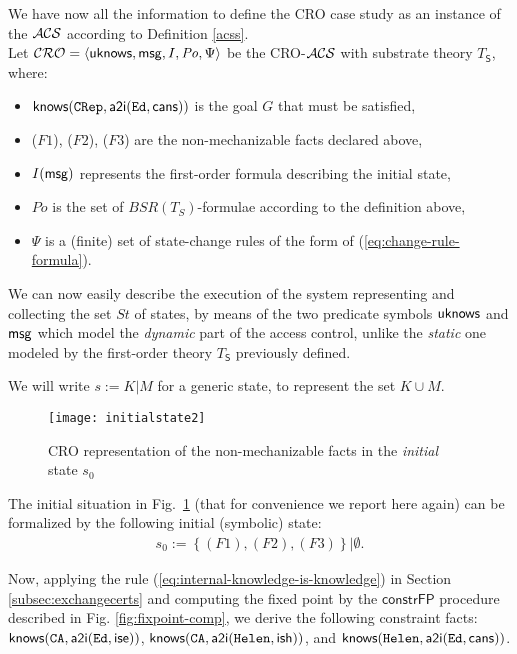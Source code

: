 \documentclass[conference]{llncs}
\newcommand{\theCA}{\ensuremath \mathtt{CA}}
\newcommand{\Ed}{\ensuremath \mathtt{Ed}}
\newcommand{\Helen}{\ensuremath \mathtt{Helen}}
\newcommand{\CRep}{\ensuremath \mathtt{CRep}}
\newcommand{\canstoredoc}{\ensuremath \mathsf{cans}}
\newcommand{\ishead}{\ensuremath \mathsf{ish}}
\newcommand{\isemployee}{\ensuremath \mathsf{ise}}
\newcommand{\know}{\ensuremath \mathsf{knows}}
\newcommand{\msg}{\ensuremath \mathsf{msg}}
\newcommand{\atoi}{\ensuremath \mathsf{a2i}}
\newcommand{\knowzero}{\ensuremath \mathsf{uknows}}
\newcommand{\CRO}{CRO}
\newcommand{\acs}{\ensuremath \mathcal{ACS}}
\begin{document}
{We have now all the information to define the \CRO{} case study as an instance of the $\acs$ according to Definition \ref{acss}. \\

  Let $\mathcal{CRO}=\langle \knowzero,\msg, I, \mathit{Po},
  \Psi\rangle$ be the \CRO{}-$\acs$ with substrate
  theory $T_{\mathsf{S}}$, where:
\begin{itemize}
\item $\know(\CRep,\atoi(\Ed, \canstoredoc))$ is the goal $G$ that must be satisfied, 
\item ($F1$), ($F2$), ($F3$) are the non-mechanizable facts declared above,
 \item $I(\msg)$ represents the first-order formula describing the initial state,
 \item $\mathit{Po}$ is the set of $\mathit{BSR}(T_S)$-formulae according to the definition above,
 \item $\Psi$ is a (finite) set of state-change rules of the form of (\ref{eq:change-rule-formula}).
\end{itemize}  
  
We can now easily describe the execution of the system representing and collecting the set $St$ of states,
by means of the two predicate symbols $\knowzero$ and $\msg$ which model the \textit{dynamic} part of the access control, unlike the \textit{static} one modeled by the first-order theory $T_{\mathsf{S}}$ previously defined. 

We will write $s:=K|M$ for a generic state, to represent the set $K \cup M$. 

\begin{figure}[t] 
  \centering
   \texttt{[image: initialstate2]}
  \caption{\CRO{} representation of the non-mechanizable facts  in the \textit{initial} state $s_0$ }
      \label{fig:CROinit}
\end{figure}

The initial situation in Fig.~\ref{fig:CROinit} (that for convenience we report here again) can be formalized by the following initial (symbolic) state:
  \begin{eqnarray*}
    s_0:= \left\{(F1), (F2), (F3)\right\} | 
    \emptyset.
  \end{eqnarray*}
 


Now, applying the rule (\ref{eq:internal-knowledge-is-knowledge}) in Section \ref{subsec:exchangecerts} and computing the fixed point by the $\mathsf{constrFP}$ procedure described in Fig. \ref{fig:fixpoint-comp}, 
we derive the following constraint facts: $\know(\theCA,
  \atoi(\Ed,\isemployee))$, $\know(\theCA, \atoi(\Helen,\ishead))$, and $\know(\Helen,
  \atoi(\Ed,\canstoredoc))$.



}
\end{document}
